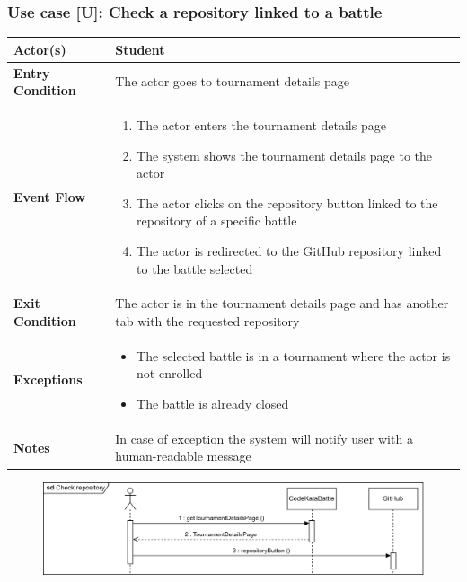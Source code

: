 \documentclass[12pt, a4paper]{report}
\newcounter{useCase}
\newcommand{\usecase}[9]{
    \def\arraystretch{1.5} 
    \subsubsection*{Use case [U#2]: #3}
    \vspace*{0.2cm}
    \begin{center}
        \begin{tabular}{|l|p{12cm}|}
            \hline
            \textbf{Actor(s)} & #4 \\
            \hline
            \textbf{Entry Condition} & #5 \\
            \hline
            \textbf{Event Flow} & #6 \\
            \hline
            \textbf{Exit Condition} & #7 \\
            \hline
            \textbf{Exceptions} & #8 \\
            \hline
            \textbf{Notes} & #9 \\
            \hline
        \end{tabular}
    \end{center}
    #1
}
\begin{document}
    \usecase{\begin{figure}[H]\centering\includegraphics[width=0.9\linewidth]{images/checkrepo.png}\end{figure}}        
    {\arabic{useCase}\stepcounter{useCase}}
    {Check a repository linked to a battle}
    {Student}
    {The actor goes to tournament details page}
    {
    \begin{enumerate}
        \item The actor enters the tournament details page
        \item The system shows the tournament details page to the actor
        \item The actor clicks on the repository button linked to the repository of a specific battle
        \item The actor is redirected to the GitHub repository linked to the battle selected
    \end{enumerate}
    }
    {The actor is in the tournament details page and has another tab with the requested repository}
    {
    \begin{itemize}
        \item The selected battle is in a tournament where the actor is not enrolled
        \item The battle is already closed
    \end{itemize}
    }
    {In case of exception the system will notify user with a human-readable message}
\end{document}
